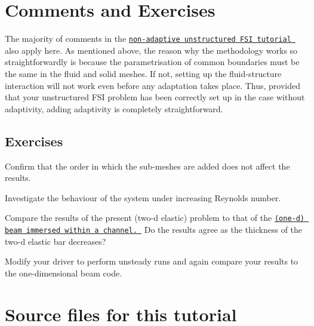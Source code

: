 \hypertarget{index_comm_ex}{}\section{Comments and Exercises}\label{index_comm_ex}
The majority of comments in the \href{../../unstructured_fsi/html/index.html}{\tt non-\/adaptive unstructured F\+SI tutorial } also apply here. As mentioned above, the reason why the methodology works so straightforwardly is because the parametrisation of common boundaries must be the same in the fluid and solid meshes. If not, setting up the fluid-\/structure interaction will not work even before any adaptation takes place. Thus, provided that your unstructured F\+SI problem has been correctly set up in the case without adaptivity, adding adaptivity is completely straightforward.\hypertarget{index_ex}{}\subsection{Exercises}\label{index_ex}

\begin{DoxyEnumerate}
\item Confirm that the order in which the sub-\/meshes are added does not affect the results.
\item Investigate the behaviour of the system under increasing Reynolds number.
\item Compare the results of the present (two-\/d elastic) problem to that of the \href{../../fsi_channel_with_leaflet/html/index.html}{\tt (one-\/d) beam immersed within a channel. } Do the results agree as the thickness of the two-\/d elastic bar decreases?
\item Modify your driver to perform unsteady runs and again compare your results to the one-\/dimensional beam code. 

 


\end{DoxyEnumerate}\hypertarget{index_sources}{}\section{Source files for this tutorial}\label{index_sources}

